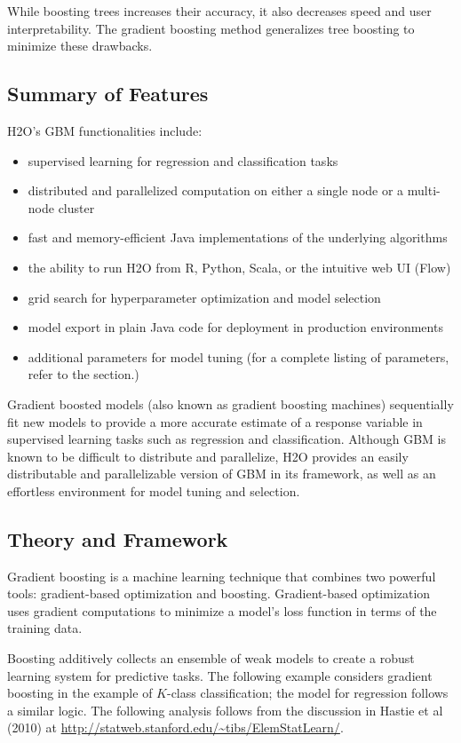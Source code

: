 While boosting trees increases their accuracy, it also decreases speed and user interpretability.
The gradient boosting method generalizes tree boosting to minimize these drawbacks.

\subsection{Summary of Features}
H2O's GBM functionalities include:

\begin{itemize}
\item supervised learning for regression and classification tasks
\item distributed and parallelized computation on either a single node or a multi-node cluster
\item fast and memory-efficient Java implementations of the underlying algorithms
\item the ability to run H2O from R, Python, Scala, or the intuitive web UI (Flow)
\item grid search for hyperparameter optimization and model selection
\item model export in plain Java code for deployment in production environments
\item additional parameters for model tuning (for a complete listing of parameters, refer to the  section.)
\end{itemize}


Gradient boosted models (also known as gradient boosting machines) sequentially fit new models to provide a more accurate estimate of a response variable in supervised learning tasks such as regression and classification. Although GBM is known to be difficult to distribute and parallelize, H2O provides an easily distributable and parallelizable version of GBM in its framework, as well as an effortless environment for model tuning and selection.


\subsection{Theory and Framework}

Gradient boosting is a machine learning technique that combines two powerful tools: gradient-based optimization and
boosting. Gradient-based optimization uses gradient computations to minimize a model's loss function in terms of
the training data. 

Boosting additively collects an ensemble of weak models to create a robust 
learning system for predictive tasks. The following example considers gradient boosting in the example of $K$-class classification; the model for regression follows a similar logic. The following analysis follows from the discussion in
Hastie et al (2010) at {\url{http://statweb.stanford.edu/~tibs/ElemStatLearn/}}.

